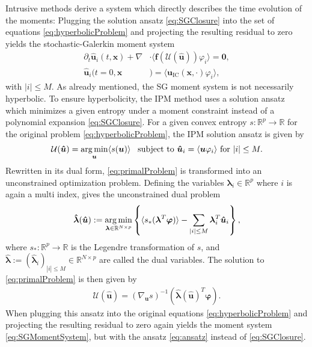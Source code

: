 Intrusive methods derive a system which directly describes the time evolution of the moments: Plugging the solution ansatz \eqref{eq:SGClosure} into the set of equations \eqref{eq:hyperbolicProblem} and projecting the resulting residual to zero yields the stochastic-Galerkin moment system
\begin{subequations}\label{eq:SGMomentSystem}
\begin{align}
\partial_t \bm{\hat u}_i(t,\bm{x}) + \nabla&\cdot\langle\bm{f}(\mathcal{U}(\bm{\hat u})) \varphi_i\rangle = \bm{0}, \\
\bm{\hat u}_i(t=0,\bm{x}&) = \langle\bm{u}_{\text{IC}}(\bm{x},\cdot)\varphi_i\rangle,
\end{align}
\end{subequations}
with $|i|\leq M$. As already mentioned, the SG moment system is not necessarily hyperbolic. To ensure hyperbolicity, the IPM method uses a solution ansatz which minimizes a given entropy under a moment constraint instead of a polynomial expansion \eqref{eq:SGClosure}. For a given convex entropy $s:\mathbb{R}^p\to\mathbb{R}$ for the original problem \eqref{eq:hyperbolicProblem}, the IPM solution ansatz is given by
\begin{align}\label{eq:primalProblem}
\mathcal{U}(\bm{\hat u}) = \operatorname*{arg\,min}_{\bm u} \langle s(\bm u) \rangle \enskip \text{ subject to } \bm{\hat u}_i = \langle \bm u \varphi_i \rangle \text{ for } |i| \leq M.
\end{align}
Rewritten in its dual form, \eqref{eq:primalProblem} is transformed into an unconstrained optimization problem. Defining the variables $\bm{\lambda}_i\in\mathbb{R}^p$ where $i$ is again a multi index, gives the unconstrained dual problem
\begin{align}\label{eq:dualProblem}
 \bm{\hat \lambda}(\bm{\hat u}) := \operatorname*{arg\,min}_{\bm{\lambda} \in \mathbb{R}^{N \times p}}
  \left\{\langle s_*(\bm{\lambda}^T \bm\varphi)\rangle - \sum_{|i|\leq M}\bm{\lambda}_i^T \bm{\hat u}_i\right\},
\end{align}
where $s_*:\mathbb{R}^p\to\mathbb{R}$ is the Legendre transformation of $s$, and $\bm{ \hat\lambda}:=(\bm{\hat{\lambda}}_i)_{|i|\leq M}\in \mathbb{R}^{N \times p}$ are called the dual variables. The solution to \eqref{eq:primalProblem} is then given by
\begin{align}\label{eq:ansatz}
 \mathcal{U}(\bm{\hat u}) = \left( \nabla_{\bm{u}} s \right)^{-1}(\bm{\hat{\lambda}}(\bm{\hat u})^T \bm{\varphi}).
\end{align}
When plugging this ansatz into the original equations \eqref{eq:hyperbolicProblem} and projecting the resulting residual to zero again yields the moment system \eqref{eq:SGMomentSystem}, but with the ansatz \eqref{eq:ansatz} instead of \eqref{eq:SGClosure}.



